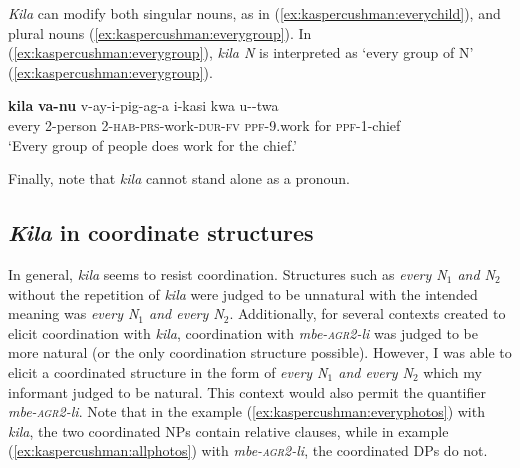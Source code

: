 \documentclass[output=paper,modfonts,nonflat]{langsci/langscibook}
\begin{document}
\begin{exe} 
\ex \begin{xlist}


\end{xlist}
\end{exe} 

\textit{Kila} can modify both singular nouns, as in (\ref{ex:kaspercushman:everychild}), and plural nouns (\ref{ex:kaspercushman:everygroup}). In (\ref{ex:kaspercushman:everygroup}), \textit{kila N} is interpreted as `every group of N' (\ref{ex:kaspercushman:everygroup}).   


\begin{exe}

\ex 
\gll \textbf{kila} \textbf{va-nu} v-ay-i-pig-ag-a i-kasi kwa u--twa \\
every 2-person 2-\textsc{hab}-\textsc{prs}-work-\textsc{dur}-\textsc{fv} \textsc{ppf}-9.work for \textsc{ppf}-1-chief \\
\glt `Every group of people does work for the chief.' \label{ex:kaspercushman:everygroup}

\end{exe}

Finally, note that \textit{kila} cannot stand alone as a pronoun.

\subsection{\textit{Kila} in coordinate structures}

In general, \textit{kila} seems to resist coordination. Structures such as \textit{every N$_{1}$ and N$_{2}$} without the repetition of \textit{kila} were judged to be unnatural with the intended meaning was \textit{every N$_{1}$ and every N$_{2}$}.  Additionally, for several contexts created to elicit coordination with \textit{kila}, coordination with \textit{mbe-\textsc{agr2}-li} was judged to be more natural (or the only coordination structure possible). However, I was able to elicit a coordinated structure in the form of \textit{every N$_{1}$ and every N$_{2}$} which my informant judged to be natural. This context would also permit the quantifier \textit{mbe-\textsc{agr2}-li}.  Note that in the example (\ref{ex:kaspercushman:everyphotos}) with \textit{kila}, the two coordinated NPs contain relative clauses, while in example (\ref{ex:kaspercushman:allphotos}) with \textit{mbe-\textsc{agr2}-li}, the coordinated DPs do not.
\end{document}
